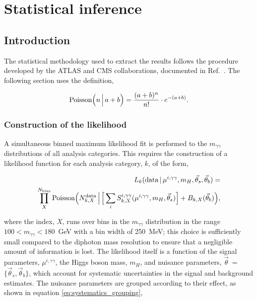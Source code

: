 \chapter{Statistical inference}
\label{chap:hgg_stats}

\section{Introduction}
The statistical methodology used to extract the results follows the procedure developed by the ATLAS and CMS collaborations, documented in Ref.~\cite{Khachatryan:2014jba}. The following section uses the definition,

\begin{equation}\label{eq:poisson_def}
    {\rm{Poisson}}\Big(n\,\Big|\,a+b\Big) = \frac{(a+b)^n}{n!} \cdot e^{-(a+b)}.
\end{equation}

\subsection{Construction of the likelihood}\label{sec:category_likelihood}
A simultaneous binned maximum likelihood fit is performed to the $m_{\gamma\gamma}$ distributions of all analysis categories. This requires the construction of a likelihood function for each analysis category, $k$, of the form,

\begin{equation}\label{eq:category_likelihood}
\begin{split}
    L_k({\rm{data}}\,|\,\mu^{i,\gamma\gamma},m_H,\vec{\theta}_s,\vec{\theta}_b) = \\
    \prod^{N_{\rm{bins}}}_{X} {\rm{Poisson}} \Big( N_{k,X}^{\rm{data}} \, \Big| \, \Big[ \sum_{i} S_{k,X}^{i,\gamma\gamma}(\mu^{i,\gamma\gamma},m_H,\vec{\theta}_s)\Big] + B_{k,X}(\vec{\theta}_b) \Big),        
\end{split}
\end{equation}


\noindent
where the index, $X$, runs over bins in the $m_{\gamma\gamma}$ distribution in the range $100<m_{\gamma\gamma}<180$~GeV with a bin width of 250~MeV; this choice is sufficiently small compared to the diphoton mass resolution to ensure that a negligible amount of information is lost. The likelihood itself is a function of the signal parameters, $\mu^{i,\gamma\gamma}$, the Higgs boson mass, $m_H$, and nuisance parameters, $\vec{\theta}$~=~$\{\vec{\theta}_s,\vec{\theta}_b\}$, which account for systematic uncertainties in the signal and background estimates. The nuisance parameters are grouped according to their effect, as shown in equation \ref{eq:systematics_grouping},


